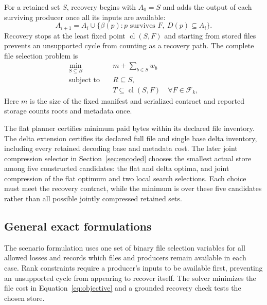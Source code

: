 For a retained set $S$, recovery begins with $A_0=S$ and adds the output of each surviving producer once all its inputs are available:
\begin{equation}
 A_{i+1}=A_i\cup\{\beta(p):p\text{ survives }F,\ D(p)\subseteq A_i\}.
 \label{eq:closure}
\end{equation}
Recovery stops at the least fixed point $\operatorname{cl}(S,F)$ and starting from stored files prevents an unsupported cycle from counting as a recovery path. The complete file selection problem is
\begin{align}
  \min_{S\subseteq B}\quad & m+\sum_{b\in S}w_b \label{eq:objective}\\
  \text{subject to}\quad & R\subseteq S,\nonumber\\
  &T\subseteq\operatorname{cl}(S,F)\quad\forall F\in\mathcal{F}_k,\nonumber
\end{align}
Here $m$ is the size of the fixed manifest and serialized contract and reported storage counts roots and metadata once.

The flat planner certifies minimum paid bytes within its declared file inventory. The delta extension certifies its declared full file and single base delta inventory, including every retained decoding base and metadata cost. The later joint compression selector in Section~\ref{sec:encoded} chooses the smallest actual store among five constructed candidates: the flat and delta optima, and joint compression of the flat optimum and two local search selections. Each choice must meet the recovery contract, while the minimum is over these five candidates rather than all possible jointly compressed retained sets.

\subsection{General exact formulations}

The scenario formulation uses one set of binary file selection variables for all allowed losses and records which files and producers remain available in each case. Rank constraints require a producer's inputs to be available first, preventing an unsupported cycle from appearing to recover itself. The solver minimizes the file cost in Equation~\ref{eq:objective} and a grounded recovery check tests the chosen store.

